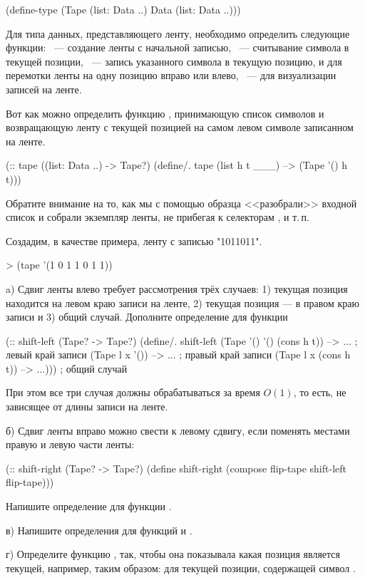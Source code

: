 \begin{SchemeCode}
(define-type (Tape (list: Data ..) Data (list: Data ..)))
\end{SchemeCode}

Для типа данных, представляющего ленту, необходимо определить следующие функции: ~--- создание ленты с начальной записью, ~--- считывание символа в текущей позиции, ~--- запись указанного символа в текущую позицию,  и  для перемотки ленты на одну позицию вправо или влево, ~--- для визуализации записей на ленте.


Вот как можно определить функцию , принимающую список символов и возвращающую ленту с текущей позицией на самом левом символе записанном на ленте.
\begin{Definition}[emph={h,t}]
(:: tape ((list: Data ..) -> Tape?)
  (define/. tape
    (list h t ___) --> (Tape '() h t)))
\end{Definition}
Обратите внимание на то, как мы с помощью образца <<разобрали>> входной список и собрали экземпляр ленты, не прибегая к селекторам ,  и т.\,п.

\begin{example}{Создадим, в качестве примера, ленту с записью "1011011".}
\begin{ExampleCode}
> (tape '(1 0 1 1 0 1 1))
\end{ExampleCode}
\end{example}

\begin{Assignment}
a) Сдвиг ленты влево требует рассмотрения трёх случаев: 1) текущая позиция находится на левом краю записи на ленте, 2) текущая позиция --- в правом краю записи и 3) общий случай.
 Дополните определение для функции 
\begin{Definition}
(:: shift-left (Tape? -> Tape?)
  (define/. shift-left
    (Tape '() '() (cons h t)) --> ...   ; левый край записи
    (Tape  l x '())           --> ...   ; правый край записи
    (Tape  l x (cons h t))    --> ...))) ; общий случай
\end{Definition}
\noindent

При этом все три случая должны обрабатываться за время $O(1)$, то  есть, не зависящее от длины записи на ленте.

б) Сдвиг ленты вправо можно свести к левому сдвигу, если поменять местами правую и левую части ленты:
\begin{Definition}
(:: shift-right (Tape? -> Tape?)
  (define shift-right
    (compose flip-tape shift-left flip-tape)))
\end{Definition}
Напишите определение для функции .

\newpage
в) Напишите определения для функций  и .

г) Определите функцию , так, чтобы она показывала какая позиция является текущей, например, таким образом:  для текущей позиции, содержащей символ .
\end{Assignment}

